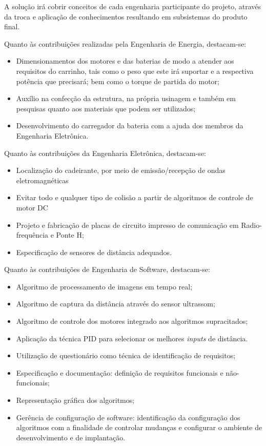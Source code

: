 A solução irá cobrir conceitos de cada engenharia participante do projeto, através da troca e aplicação de conhecimentos resultando em subsistemas do produto final. 


Quanto às contribuições realizadas pela Engenharia de Energia, destacam-se:

\begin{itemize}
    \item Dimensionamentos dos motores e das baterias de modo a atender aos requisitos do carrinho, tais como o peso que este irá suportar e a respectiva potência que precisará; bem como o torque de partida do motor;
	\item Auxílio na confecção da estrutura, na própria usinagem e também em pesquisas quanto aos materiais que podem ser utilizados; 
	\item Desenvolvimento do carregador da bateria com a ajuda dos membros da Engenharia Eletrônica.
\end{itemize}

Quanto às contribuições da Engenharia Eletrônica, destacam-se:

\begin{itemize} 
    \item Localização do cadeirante, por meio de emissão/recepção de ondas eletromagnéticas
    \item Evitar todo e qualquer tipo de colisão a partir de algoritmos de controle de motor DC
    \item Projeto e fabricação de placas de circuito impresso de comunicação em Radio-frequência e Ponte H;
    \item Especificação de sensores de distância adequados.
\end{itemize}
 
Quanto às contribuições de Engenharia de Software, destacam-se:

\begin{itemize}
    \item Algoritmo de processamento de imagens em tempo real;
    \item Algoritmo de captura da distância através do sensor ultrassom;
    \item Algoritmo de controle dos motores integrado aos algoritmos supracitados;
    \item Aplicação da técnica PID para selecionar os melhores \textit{inputs} de distância.
    \item Utilização de questionário como técnica de identificação de requisitos;
    \item Especificação e documentação: definição de requisitos funcionais e não-funcionais;
    \item Representação gráfica dos algoritmos;
    \item Gerência de configuração de software:  identificação da configuração dos algoritmos com a finalidade de controlar mudanças e configurar o ambiente de desenvolvimento e de implantação.
\end{itemize}

